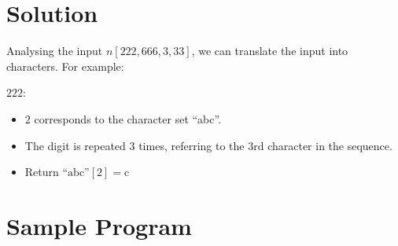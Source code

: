 \documentclass[12pt]{report}
\begin{document}
	\section*{Solution}
	Analysing the input $n[222, 666, 3, 33]$, we can translate the input into characters. For example:
	
	$222$:
	\begin{itemize}
		\item $2$ corresponds to the character set ``abc''.
		\item The digit is repeated 3 times, referring to the 3rd character in the sequence.
		\item Return $\text{``abc''}[2]=\text{c}$
	\end{itemize}


	\section*{Sample Program}
	
	
\end{document}
